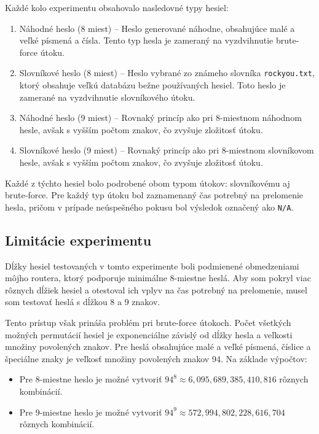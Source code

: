 \documentclass[12pt, twoside]{book}
\begin{document}
Každé kolo experimentu obsahovalo nasledovné typy hesiel: 
\begin{enumerate} 
\item Náhodné heslo (8 miest) – Heslo generované náhodne, obsahujúce malé a veľké písmená a čísla. Tento typ hesla je zameraný na vyzdvihnutie brute-force útoku.
\item Slovníkové heslo (8 miest) – Heslo vybrané zo známeho slovníka \texttt{rockyou.txt}, ktorý obsahuje veľkú databázu bežne používaných hesiel. Toto heslo je zamerané na vyzdvihnutie slovníkového útoku. 
\item Náhodné heslo (9 miest) – Rovnaký princíp ako pri 8-miestnom náhodnom hesle, avšak s vyšším počtom znakov, čo zvyšuje zložitosť útoku. 
\item Slovníkové heslo (9 miest) – Rovnaký princíp ako pri 8-miestnom slovníkovom hesle, avšak s vyšším počtom znakov, čo zvyšuje zložitosť útoku.
 \end{enumerate}

Každé z týchto hesiel bolo podrobené obom typom útokov: slovníkovému aj brute-force. Pre každý typ útoku bol zaznamenaný čas potrebný na prelomenie hesla, pričom v prípade neúspešného pokusu bol výsledok označený ako \texttt{N/A}.


\subsection{Limitácie experimentu}
Dĺžky hesiel testovaných v tomto experimente boli podmienené obmedzeniami môjho routera, ktorý podporuje minimálne 8-miestne heslá. Aby som pokryl viac rôznych dĺžiek hesiel a otestoval ich vplyv na čas potrebný na prelomenie, musel som testovať heslá s dĺžkou 8 a 9 znakov.

Tento prístup však prináša problém pri brute-force útokoch. Počet všetkých možných permutácií hesiel je exponenciálne závislý od dĺžky hesla a veľkosti množiny povolených znakov. Pre heslá obsahujúce malé a veľké písmená, číslice a špeciálne znaky je veľkosť množiny povolených znakov 94. Na základe výpočtov:

\begin{itemize} 
\item Pre 8-miestne heslo je možné vytvoriť $94^8 \approx 6,095,689,385,410,816$ rôznych kombinácií.
 \item Pre 9-miestne heslo je možné vytvoriť $94^9 \approx 572,994,802,228,616,704$ rôznych kombinácií. 
\end{itemize}
\end{document}
